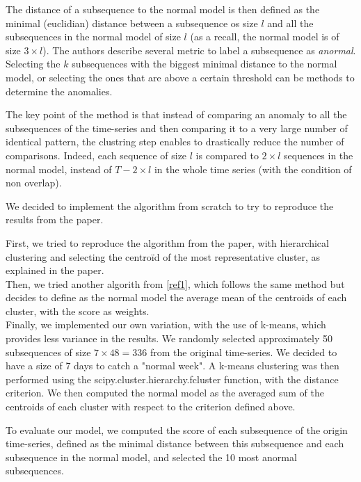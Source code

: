 \documentclass[11pt]{article}
\begin{document}
The distance of a subsequence to the normal model is then defined as the minimal (euclidian) distance between a subsequence os size $l$ and all the subsequences in the normal model of size $l$ (as a recall, the normal model is of size $3 \times l$).
The authors describe several metric to label a subsequence as \textit{anormal}. 
Selecting the $k$ subsequences with the biggest minimal distance to the normal model, or selecting the ones that are above a certain threshold can be methods to determine the anomalies.

The key point of the method is that instead of comparing an anomaly to all the subsequences of the time-series and then comparing it to a very large number of identical pattern, the clustring step enables to drastically reduce the number of comparisons. 
Indeed, each sequence of size $l$ is compared to $2 \times l $ sequences in the normal model, instead of $T - 2 \times l$ in the whole time series (with the condition of non overlap). 


We decided to implement the algorithm from scratch to try to reproduce the results from the paper. 

First, we tried to reproduce the algorithm from the paper, with hierarchical clustering and selecting the centroïd of the most representative cluster, as explained in the paper.\\

Then, we tried another algorith from \ref{ref1}, which follows the same method but decides to define as the normal model the average mean of the centroids of each cluster, with the score as weights.\\

Finally, we implemented our own variation, with the use of k-means, which provides less variance in the results. 
We randomly selected approximately 50 subsequences of size $ 7 \times 48 = 336$ from the original time-series. 
We decided to have a size of 7 days to catch a "normal week". 
A k-means clustering was then performed using the scipy.cluster.hierarchy.fcluster function, with the distance criterion. 
We then computed the normal model as the averaged sum of the centroids of each cluster with respect to the criterion defined above.

To evaluate our model, we computed the score of each subsequence of the origin time-series, defined as the minimal distance between this subsequence and each subsequence in the normal model, and selected the 10 most anormal subsequences.

\end{document}
